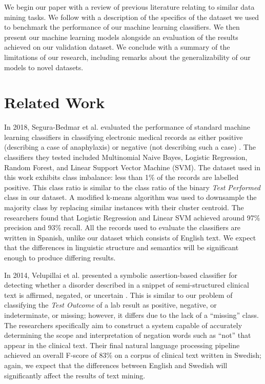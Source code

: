 \documentclass[12pt]{article}
\begin{document}
We begin our paper with a review of previous literature relating to similar data mining tasks. We follow with a description of the specifics of the dataset we used to benchmark the performance of our machine learning classifiers. We then present our machine learning models alongside an evaluation of the results achieved on our validation dataset. We conclude with a summary of the limitations of our research, including remarks about the generalizability of our models to novel datasets.

\section{Related Work}

In 2018, Segura-Bedmar et al. evaluated the performance of standard machine learning classifiers in classifying electronic medical records as either positive (describing a case of anaphylaxis) or negative (not describing such a case) \cite{predicting_of_anaphylaxis_in}. The classifiers they tested included Multinomial Naive Bayes, Logistic Regression, Random Forest, and Linear Support Vector Machine (SVM). The dataset used in this work exhibits class imbalance: less than 1\% of the records are labelled positive. This class ratio is similar to the class ratio of the binary \textit{Test Performed} class in our dataset. A modified k-means algorithm was used to downsample the majority class by replacing similar instances with their cluster centroid. The researchers found that Logistic Regression and Linear SVM achieved around 97\% precision and 93\% recall. All the records used to evaluate the classifiers are written in Spanish, unlike our dataset which consists of English text. We expect that the differences in linguistic structure and semantics will be significant enough to produce differing results.

In 2014, Velupillai et al. presented a symbolic assertion-based classifier for detecting whether a disorder described in a snippet of semi-structured clinical text is affirmed, negated, or uncertain \cite{cue-based_assertion_classification_for}. This is similar to our problem of classifying the \textit{Test Outcome} of a lab result as positive, negative, or indeterminate, or missing; however, it differs due to the lack of a ``missing'' class. The researchers specifically aim to construct a system capable of accurately determining the scope and interpretation of negation words such as ``not'' that appear in the clinical text. Their final natural language processing pipeline achieved an overall F-score of 83\% on a corpus of clinical text written in Swedish; again, we expect that the differences between English and Swedish will significantly affect the results of text mining.
\end{document}
